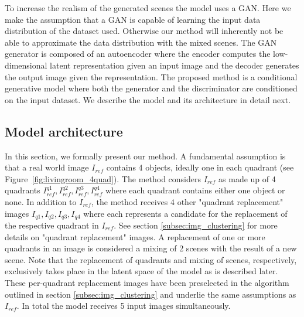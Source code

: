 \documentclass[12pt,a4paper]{article}
\begin{document}
To increase the realism of the generated scenes the model uses a GAN. Here we make the assumption that a GAN is capable of learning the input data distribution of the dataset used. Otherwise our method will inherently not be able to approximate the data distribution with the mixed scenes. The GAN generator is composed of an autoencoder where the encoder computes the low-dimensional latent representation given an input image and the decoder generates the output image given the representation. The proposed method is a conditional generative model where both the generator and the discriminator are conditioned on the input dataset. We describe the model and its architecture in detail next.



\subsection{Model architecture}\label{subsec:model_arch}
In this section, we formally present our method. A fundamental assumption is that a real world image $I_{ref}$ contains 4 objects, ideally one in each quadrant (see Figure~\ref{fig:livingroom_4quad}). The method considers $I_{ref}$ as made up of 4 quadrants $I^{q1}_{ref}, I^{q2}_{ref}, I^{q3}_{ref}, I^{q4}_{ref}$ where each quadrant contains either one object or none. In addition to $I_{ref}$, the method receives 4 other "quadrant replacement" images $I_{q1},I_{q2},I_{q3},I_{q4}$ where each represents a candidate for the replacement of the respective quadrant in $I_{ref}$. See section \ref{subsec:img_clustering} for more details on "quadrant replacement" images. A replacement of one or more quadrants in an image is considered a mixing of 2 scenes with the result of a new scene. Note that the replacement of quadrants and mixing of scenes, respectively, exclusively takes place in the latent space of the model as is described later. These per-quadrant replacement images have been preselected in the algorithm outlined in section \ref{subsec:img_clustering} and underlie the same assumptions as $I_{ref}$. In total the model receives 5 input images simultaneously.
\end{document}
